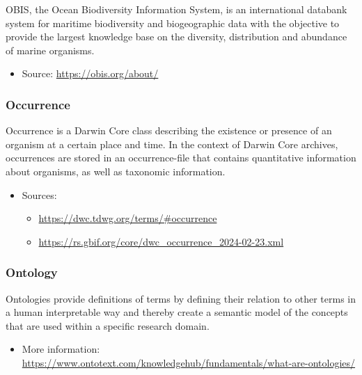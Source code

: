 \documentclass[
  oneside]{book}
\providecommand{\tightlist}{%
  \setlength{\itemsep}{0pt}\setlength{\parskip}{0pt}}
\begin{document}
OBIS, the Ocean Biodiversity Information System, is an international databank system for maritime biodiversity and biogeographic data with the objective to provide the largest knowledge base on the diversity, distribution and abundance of marine organisms.

\begin{itemize}
\tightlist
\item
  Source: \url{https://obis.org/about/}
\end{itemize}

\subsubsection*{Occurrence}\label{occurrence}

Occurrence is a Darwin Core class describing the existence or presence of an organism at a certain place and time. In the context of Darwin Core archives, occurrences are stored in an occurrence-file that contains quantitative information about organisms, as well as taxonomic information.

\begin{itemize}
\tightlist
\item
  Sources:

  \begin{itemize}
  \tightlist
  \item
    \url{https://dwc.tdwg.org/terms/\#occurrence}
  \item
    \url{https://rs.gbif.org/core/dwc_occurrence_2024-02-23.xml}
  \end{itemize}
\end{itemize}

\subsubsection*{Ontology}\label{ontology}

Ontologies provide definitions of terms by defining their relation to other terms in a human interpretable way and thereby create a semantic model of the concepts that are used within a specific research domain.

\begin{itemize}
\tightlist
\item
  More information: \url{https://www.ontotext.com/knowledgehub/fundamentals/what-are-ontologies/}
\end{itemize}
\end{document}
